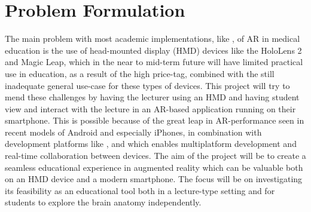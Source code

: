 


\section{Problem Formulation}


The main problem with most academic implementations, like \citep{Wish2020}, of AR in medical education is the use of head-mounted display (HMD) devices like the HoloLens 2 and Magic Leap, which in the near to mid-term future will have limited practical use in education, as a result of the high price-tag, combined with the still inadequate general use-case for these types of devices.
This project will try to mend these challenges by having the lecturer using an HMD and having student view and interact with the lecture in an AR-based application running on their smartphone. 
This is possible because of the great leap in AR-performance seen in recent models of Android and especially iPhones, in combination with development platforms like ,  and  which enables multiplatform development and real-time collaboration between devices. 
The aim of the project will be to create a seamless educational experience in augmented reality which can be valuable both on an HMD device and a modern smartphone. The focus will be on investigating its feasibility as an educational tool both in a lecture-type setting and for students to explore the brain anatomy independently. 


